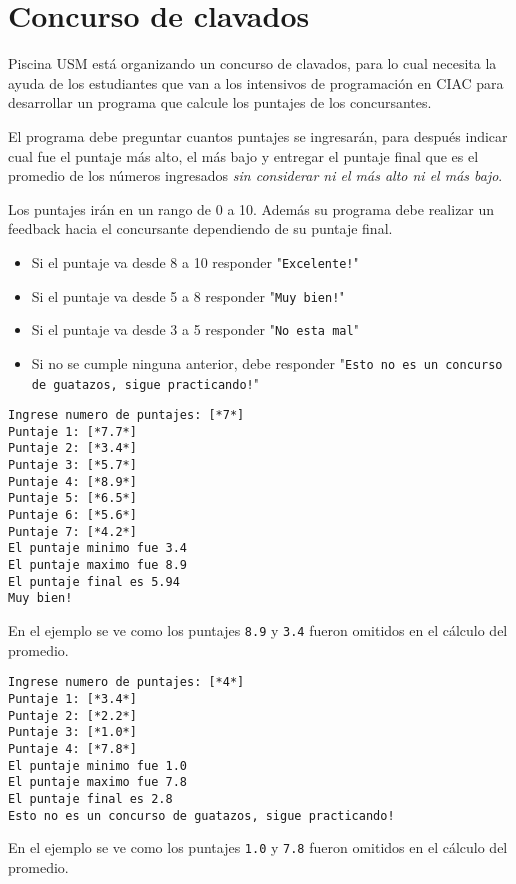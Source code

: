 \section{Concurso de clavados}
Piscina USM está organizando un concurso de clavados, para lo cual necesita la ayuda de los estudiantes que van a los intensivos de programación en CIAC para desarrollar un programa que calcule los puntajes de los concursantes.

El programa debe preguntar cuantos puntajes se ingresarán, para después indicar cual fue el puntaje más alto, el más bajo y entregar el puntaje final que es el promedio de los números ingresados \textit{sin considerar ni el más alto ni el más bajo}.

Los puntajes irán en un rango de 0 a 10. Además su programa debe realizar un feedback hacia el concursante dependiendo de su puntaje final.
\begin{itemize}
    \item Si el puntaje va desde 8 a 10 responder "\texttt{Excelente!}"
    \item Si el puntaje va desde 5 a 8 responder "\texttt{Muy bien!}"
    \item Si el puntaje va desde 3 a 5 responder "\texttt{No esta mal}"
    \item Si no se cumple ninguna anterior, debe responder "\texttt{Esto no es un concurso de guatazos, sigue practicando!}"
\end{itemize}

\begin{lstlisting}[style=consola]
Ingrese numero de puntajes: [*7*]
Puntaje 1: [*7.7*]
Puntaje 2: [*3.4*]
Puntaje 3: [*5.7*]
Puntaje 4: [*8.9*]
Puntaje 5: [*6.5*]
Puntaje 6: [*5.6*]
Puntaje 7: [*4.2*]
El puntaje minimo fue 3.4
El puntaje maximo fue 8.9
El puntaje final es 5.94
Muy bien!
\end{lstlisting}

En el ejemplo se ve como los puntajes \texttt{8.9} y \texttt{3.4} fueron omitidos en el cálculo del promedio.

\begin{lstlisting}[style=consola]
Ingrese numero de puntajes: [*4*]
Puntaje 1: [*3.4*]
Puntaje 2: [*2.2*]
Puntaje 3: [*1.0*]
Puntaje 4: [*7.8*]
El puntaje minimo fue 1.0
El puntaje maximo fue 7.8
El puntaje final es 2.8
Esto no es un concurso de guatazos, sigue practicando!
\end{lstlisting}

En el ejemplo se ve como los puntajes \texttt{1.0} y \texttt{7.8} fueron omitidos en el cálculo del promedio.

